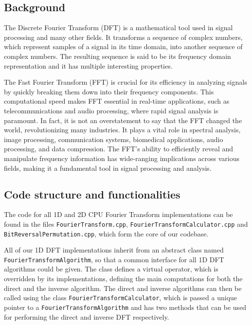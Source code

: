 \subsection{Background}
The Discrete Fourier Transform (DFT) is a mathematical tool used in signal processing and many other fields. It transforms a sequence of complex numbers, which represent samples of a signal in its time domain, into another sequence of complex numbers. The resulting sequence is said to be its frequency domain representation and it has multiple interesting properties.

The Fast Fourier Transform (FFT)\cite{fft_algorithms_1}\cite{fft_algorithms_2} is crucial for its efficiency in analyzing signals by quickly breaking them down into their frequency components. This computational speed makes FFT essential in real-time applications, such as telecommunications and audio processing, where rapid signal analysis is paramount. In fact, it is not an overstatement to say that the FFT changed the world, revolutionizing many industries. It plays a vital role in spectral analysis\cite{fft_application_3}\cite{fft_application_4}, image processing\cite{fft_application_5}, communication systems\cite{fft_application_1}, biomedical applications\cite{fft_application_6}, audio processing\cite{fft_application_2}, and data compression\cite{fft_application_7}. The FFT's ability to efficiently reveal and manipulate frequency information has wide-ranging implications across various fields, making it a fundamental tool in signal processing and analysis.

\subsection{Code structure and functionalities}
The code for all 1D and 2D CPU Fourier Transform implementations can be found in the files \texttt{Fourier\-Transform.cpp}, \texttt{Fourier\-Transform\-Calculator.cpp} and \texttt{Bit\-Reversal\-Permutation.cpp}, which form the core of our codebase. 

All of our 1D DFT implementations inherit from an abstract class named \texttt{Fourier\-Transform\-Algorithm}, so that a common interface for all 1D DFT algorithms could be given. The class defines a virtual operator, which is overridden by its implementations, defining the main computations for both the direct and the inverse algorithm. The direct and inverse algorithms can then be called using the class \texttt{Fourier\-Transform\-Calculator}, which is passed a unique pointer to a \texttt{Fourier\-Transform\-Algorithm} and has two methods that can be used for performing the direct and inverse DFT respectively. 

